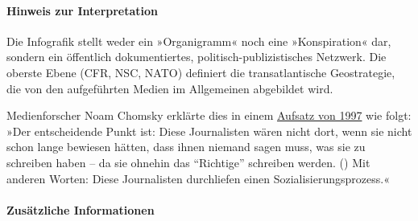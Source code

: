 \hypertarget{hinweis-zur-interpretation}{%
\paragraph{Hinweis zur
Interpretation}\label{hinweis-zur-interpretation}}

Die Infografik stellt weder ein »Organigramm« noch eine »Konspiration«
dar, sondern ein öffentlich dokumentiertes, politisch-publizistisches
Netzwerk. Die oberste Ebene (CFR, NSC, NATO) definiert die
transatlantische Geostrategie, die von den aufgeführten Medien im
Allgemeinen abgebildet wird.

Medienforscher Noam Chomsky erklärte dies in einem
\href{https://chomsky.info/199710__/}{Aufsatz von 1997} wie folgt: »Der
entscheidende Punkt ist: Diese Journalisten wären nicht dort, wenn sie
nicht schon lange bewiesen hätten, dass ihnen niemand sagen muss, was
sie zu schreiben haben -- da sie ohnehin das ``Richtige'' schreiben
werden. () Mit anderen Worten: Diese Journalisten durchliefen einen
Sozialisierungsprozess.«

\hypertarget{zusuxe4tzliche-informationen}{%
\paragraph{Zusätzliche
Informationen}\label{zusuxe4tzliche-informationen}}


